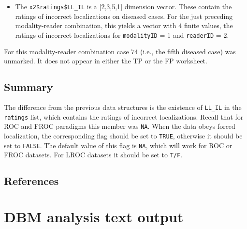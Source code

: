 \documentclass[
]{book}
\newenvironment{Shaded}{\begin{snugshade}}{\end{snugshade}}
\newcommand{\CommentTok}[1]{\textcolor[rgb]{0.56,0.35,0.01}{\textit{#1}}}
\newcommand{\DecValTok}[1]{\textcolor[rgb]{0.00,0.00,0.81}{#1}}
\newcommand{\NormalTok}[1]{#1}
\newcommand{\OperatorTok}[1]{\textcolor[rgb]{0.81,0.36,0.00}{\textbf{#1}}}
\providecommand{\tightlist}{%
  \setlength{\itemsep}{0pt}\setlength{\parskip}{0pt}}
\begin{document}
\begin{itemize}
\tightlist
\item
  The \texttt{x2\$ratings\$LL\_IL} is a {[}2,3,5,1{]} dimension vector. These contain the ratings of incorrect localizations on diseased cases. For the just preceding modality-reader combination, this yields a vector with 4 finite values, the ratings of incorrect localizations for \texttt{modalityID} = 1 and \texttt{readerID} = 2.
\end{itemize}

\begin{Shaded}
\end{Shaded}

For this modality-reader combination case 74 (i.e., the fifth diseased case) was unmarked. It does not appear in either the TP or the FP worksheet.

\hypertarget{quick-start-lroc-data-summary}{%
\section{Summary}\label{quick-start-lroc-data-summary}}

The difference from the previous data structures is the existence of \texttt{LL\_IL} in the \texttt{ratings} list, which contains the ratings of incorrect localizations. Recall that for ROC and FROC paradigms this member was \texttt{NA}. When the data obeys forced localization, the corresponding flag should be set to \texttt{TRUE}, otherwise it should be set to \texttt{FALSE}. The default value of this flag is \texttt{NA}, which will work for ROC or FROC datasets. For LROC datasets it should be set to \texttt{T/F}.

\hypertarget{quick-start-lroc-data-references}{%
\section{References}\label{quick-start-lroc-data-references}}

\hypertarget{quick-start-dbm-text}{%
\chapter{DBM analysis text output}\label{quick-start-dbm-text}}
\end{document}
